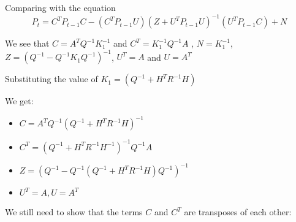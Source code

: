\documentclass{tufte-handout}
\begin{document}
\begin{enumerate}[(a)]
Comparing with the equation 
    \begin{equation*}
        P_t = C^TP_{t-1}C - (C^T P_{t-1}U)(Z + U^TP_{t-1}U)^{-1}(U^TP_{t-1}C) + N
    \end{equation*}

    We see that $C = A^TQ^{-1}K_1^{-1} $ and  $C^T = K_1^{-1} Q^{-1}A$ , $N = K_1^{-1}$, $Z = (Q^{-1} - Q^{-1}K_1 Q^{-1})^{-1} $, $U^T =A $ and $U = A^T$

    Substituting the value of $K_1=(Q^{-1}  + H^TR^{-1}H) $

    We get: 
    \begin{itemize}
        \item  $C = A^TQ^{-1}(Q^{-1} + H^T R^{-1}H)^{-1}$
        \item  $C^T = (Q^{-1} + H^T R^{-1}H^{-1})^{-1}Q^{-1}A$
        \item $Z  = (Q^{-1} - Q^{-1}(Q^{-1}  + H^TR^{-1}H) Q^{-1})^{-1} $
        \item $U^T = A , U = A^T$
    \end{itemize}
\end{enumerate}

We still need to show that the terms $C$ and $C^T$ are 
transposes of each other: 



\end{document}
